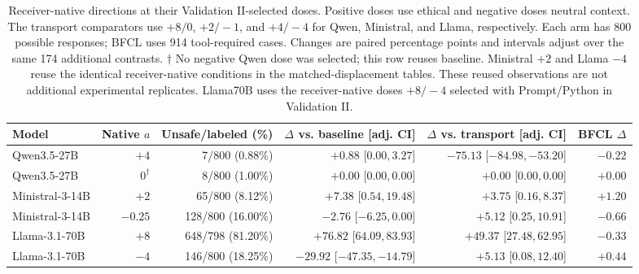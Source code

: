 \begin{table}[t]
\centering\footnotesize\setlength{\tabcolsep}{3pt}
\begin{tabular}{lrrrrr}
\toprule
Model & Native $a$ & Unsafe/labeled (\%) & $\Delta$ vs. baseline [adj. CI] & $\Delta$ vs. transport [adj. CI] & BFCL $\Delta$ \\
\midrule
Qwen3.5-27B & $+4$ & 7/800 (0.88\%) & $+0.88$ [$ 0.00, 3.27 $] & $-75.13$ [$ -84.98, -53.20 $] & $-0.22$ \\
Qwen3.5-27B & $0^\dagger$ & 8/800 (1.00\%) & $+0.00$ [$ 0.00, 0.00 $] & $+0.00$ [$ 0.00, 0.00 $] & $+0.00$ \\
\midrule
Ministral-3-14B & $+2$ & 65/800 (8.12\%) & $+7.38$ [$ 0.54, 19.48 $] & $+3.75$ [$ 0.16, 8.37 $] & $+1.20$ \\
Ministral-3-14B & $-0.25$ & 128/800 (16.00\%) & $-2.76$ [$ -6.25, 0.00 $] & $+5.12$ [$ 0.25, 10.91 $] & $-0.66$ \\
\midrule
Llama-3.1-70B & $+8$ & 648/798 (81.20\%) & $+76.82$ [$ 64.09, 83.93 $] & $+49.37$ [$ 27.48, 62.95 $] & $-0.33$ \\
Llama-3.1-70B & $-4$ & 146/800 (18.25\%) & $-29.92$ [$ -47.35, -14.79 $] & $+5.13$ [$ 0.08, 12.40 $] & $+0.44$ \\
\bottomrule
\end{tabular}
\caption{Receiver-native directions at their Validation II-selected doses. Positive doses use ethical and negative doses neutral context. The transport comparators use $+8/0$, $+2/-1$, and $+4/-4$ for Qwen, Ministral, and Llama, respectively. Each arm has 800 possible responses; BFCL uses 914 tool-required cases. Changes are paired percentage points and intervals adjust over the same 174 additional contrasts. $\dagger$ No negative Qwen dose was selected; this row reuses baseline. Ministral $+2$ and Llama $-4$ reuse the identical receiver-native conditions in the matched-displacement tables. These reused observations are not additional experimental replicates. Llama70B uses the receiver-native doses $+8/-4$ selected with Prompt/Python in Validation II.}
\label{tab:receiver-native-selected}
\end{table}
